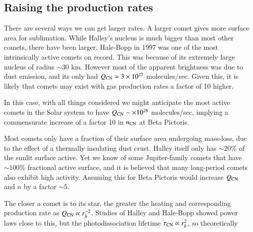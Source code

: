 \documentclass{aa}
\newcommand{\bp}{Beta Pictoris}
\begin{document}
\subsection{Raising the  production rates}

There are several ways we can get larger  rates.
%
A larger comet gives more surface area for sublimation.
%
While Halley's nucleus is much bigger than most other comets, there have been larger.
%
Hale-Bopp in 1997 was one of the most intrinsically active comets on record.
%
This was because of its extremely large nucleus of radius $\sim 30$ km.
%
However most of the apparent brightness was due to dust emission, and its only had $Q_{\ce{CN}}\simeq 3\times10^{27}$ molecules/sec.
%
Given this, it is likely that comets may exist with gas production rates a factor of 10 higher.

In this case, with all things considered we might anticipate the most active comets in the Solar system to have $Q_{\ce{CN}}\sim \times10^{28}$ molecules/sec, implying a commensurate increase of a factor 10 in $n_{\ce{CN}}$ at \bp{}.


Most comets only have a fraction of their surface area undergoing mass-loss, due to the effect of a thermally insulating dust crust.
%
Halley itself only has $\sim 20$\% of the sunlit surface active.
%
Yet we know of some Jupiter-family comets that have $\sim 100$\% fractional active surface, and it is believed that many long-period comets also exhibit high activity.
%
Assuming this for \bp{} would increase $Q_{\ce{CN}}$ and $n$ by a factor $\sim 5$.


The closer a comet is to its star, the greater the heating and corresponding production rate as $Q_{\ce{CN}}\propto r_h^{-2}$.
%
Studies of Halley and Hale-Bopp showed power laws close to this, but the photodissociation lifetime $\tau_{\ce{CN}}\propto r_h^{2}$, so theoretically
\end{document}
